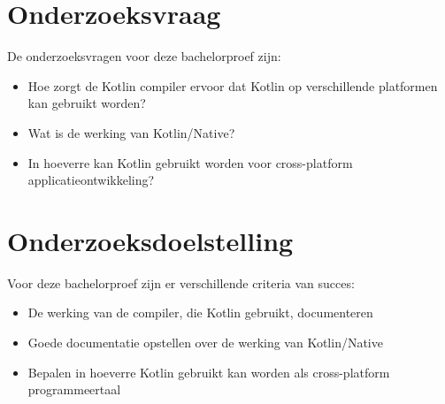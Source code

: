 
\section{Onderzoeksvraag}
\label{sec:onderzoeksvraag}
De onderzoeksvragen voor deze bachelorproef zijn: 
\begin{itemize}
	\item Hoe zorgt de Kotlin compiler ervoor dat Kotlin op verschillende platformen kan gebruikt worden?
	\item Wat is de werking van Kotlin/Native?
	\item In hoeverre kan Kotlin gebruikt worden voor cross-platform applicatieontwikkeling?
\end{itemize}

\section{Onderzoeksdoelstelling}
\label{sec:onderzoeksdoelstelling}
Voor deze bachelorproef zijn er verschillende criteria van succes:
\begin{itemize}
	\item De werking van de compiler, die Kotlin gebruikt, documenteren
	\item Goede documentatie opstellen over de werking van Kotlin/Native
	\item Bepalen in hoeverre Kotlin gebruikt kan worden als cross-platform programmeertaal
\end{itemize}

